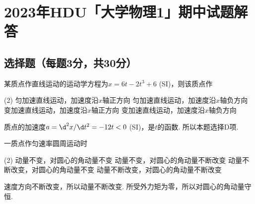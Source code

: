 \chapter*{2023年\textsf{HDU}「大学物理1」期中试题解答}



\section{选择题（每题3分，共30分）}

\begin{problem} %
    某质点作直线运动的运动学方程为$x=6t-2t^3+6$ (SI)，则该质点作
    \begin{tasks}(2)
        \task 匀加速直线运动，加速度沿$x$轴正方向
        \task 匀加速直线运动，加速度沿$x$轴负方向
        \task 变加速直线运动，加速度沿$x$轴正方向
        \task[\true] 变加速直线运动，加速度沿$x$轴负方向
    \end{tasks}
\end{problem}
\begin{solution}
    质点的加速度$a=\d^2 x/\d t^2=-12t<0$ (SI)，是$t$的函数. 所以本题选择D项.
\end{solution}

\begin{problem} %
    一质点作匀速率圆周运动时
    \begin{tasks}(2)
        \task 动量不变，对圆心的角动量不变
        \task 动量不变，对圆心的角动量不断改变
        \task[\true] 动量不断改变，对圆心的角动量不变
        \task 动量不断改变，对圆心的角动量不断改变
    \end{tasks}
\end{problem}
\begin{solution}
    速度方向不断改变，所以动量不断改变. 所受外力矩为零，所以对圆心的角动量守恒.
\end{solution}

